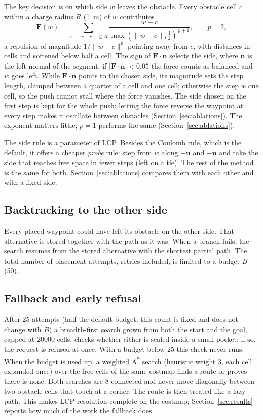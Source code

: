 \documentclass[conference]{IEEEtran}
\newcommand{\lcp}{LCP}
\begin{document}
The key decision is on which side $w$ leaves the obstacle. Every obstacle cell
$c$ within a charge radius $R$ (\SI{1}{m}) of $w$ contributes
\begin{equation}
\mathbf{F}(w) = \sum_{c:\,\|w-c\|\le R} \frac{w - c}{\max(\|w - c\|,\tfrac12)^{\,p+1}},
\qquad p = 2,
\end{equation}
a repulsion of magnitude $1/\|w-c\|^{p}$ pointing away from $c$, with distances in
cells and softened below half a cell. The sign of $\mathbf{F}\cdot\mathbf{n}$
selects the side, where $\mathbf{n}$ is the left normal of the segment; if
$|\mathbf{F}\cdot\mathbf{n}| < 0.05$ the force counts as balanced and $w$ goes
left. While $\mathbf{F}\cdot\mathbf{n}$ points to the chosen side, its magnitude
sets the step length, clamped between a quarter of a cell and one cell; otherwise
the step is one cell, so the push cannot stall where the force vanishes. The side
chosen on the first step is kept for the whole push: letting the force reverse
the waypoint at every step makes it oscillate between obstacles
(Section~\ref{sec:ablations}). The exponent matters little; $p = 1$ performs the
same (Section~\ref{sec:ablations}).

The side rule is a parameter of \lcp{}. Besides the Coulomb rule, which is the
default, it offers a cheaper \emph{probe} rule: step from $w$ along $+\mathbf{n}$
and $-\mathbf{n}$ and take the side that reaches free space in fewer steps (left on a tie). The
rest of the method is the same for both. Section~\ref{sec:ablations} compares
them with each other and with a fixed side.

\subsection{Backtracking to the other side}

Every placed waypoint could have left its obstacle on the other side. That
alternative is stored together with the path as it was. When a branch fails, the
search resumes from the stored alternative with the shortest partial path. The
total number of placement attempts, retries included, is limited to a budget $B$
(50).

\subsection{Fallback and early refusal}

After 25 attempts (half the default budget; this count is fixed and does not
change with $B$) a breadth-first search grown from both the start and the goal,
capped at \num{20000} cells, checks whether either is sealed inside a small
pocket; if so, the request is refused at once. With a budget below 25 this check
never runs. When the budget is used up, a weighted A\textsuperscript{*} search
(heuristic weight 3, each cell expanded once) over the free cells of the same
costmap finds a route or proves there is none. Both searches are 8-connected and
never move diagonally between two obstacle cells that touch at a corner. The
route is then treated like a lazy path. This makes \lcp{} resolution-complete on
the costmap; Section~\ref{sec:results} reports how much of the work the fallback
does.
\end{document}
